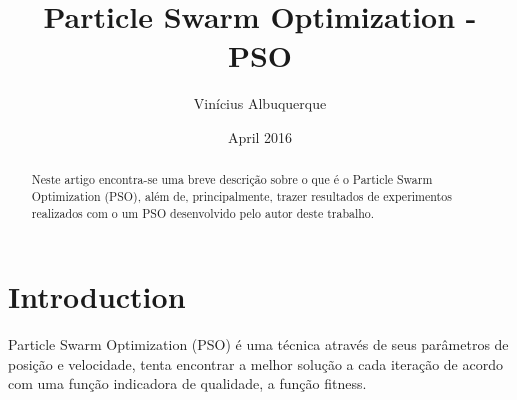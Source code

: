 \documentclass[11pt,twocolumn]{article}
\title{Particle Swarm Optimization - PSO}
\author{Vinícius Albuquerque}
\date{April 2016}
\begin{document}
\maketitle

\begin{abstract}
    Neste artigo encontra-se uma breve descrição sobre o que é o Particle Swarm Optimization (PSO), além de, principalmente, trazer resultados de experimentos realizados com o um PSO desenvolvido pelo autor deste trabalho.
\end{abstract}

\section{Introduction}
    Particle Swarm Optimization (PSO) é uma técnica através de seus parâmetros de posição e velocidade, tenta encontrar a melhor solução a cada iteração de acordo com uma função indicadora de qualidade, a função fitness.
\end{document}
